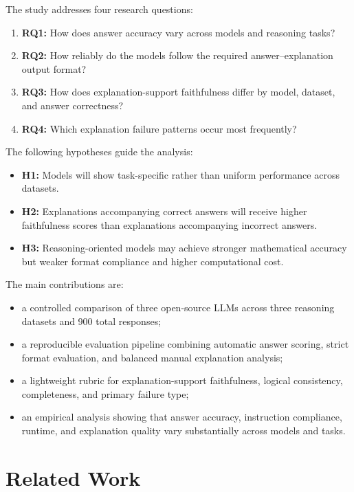 \documentclass{article}
\begin{document}
The study addresses four research questions:

\begin{enumerate}
    \item \textbf{RQ1:} How does answer accuracy vary across models and reasoning tasks?
    \item \textbf{RQ2:} How reliably do the models follow the required answer--explanation output format?
    \item \textbf{RQ3:} How does explanation-support faithfulness differ by model, dataset, and answer correctness?
    \item \textbf{RQ4:} Which explanation failure patterns occur most frequently?
\end{enumerate}

The following hypotheses guide the analysis:

\begin{itemize}
    \item \textbf{H1:} Models will show task-specific rather than uniform performance across datasets.
    \item \textbf{H2:} Explanations accompanying correct answers will receive higher faithfulness scores than explanations accompanying incorrect answers.
    \item \textbf{H3:} Reasoning-oriented models may achieve stronger mathematical accuracy but weaker format compliance and higher computational cost.
\end{itemize}

The main contributions are:

\begin{itemize}
    \item a controlled comparison of three open-source LLMs across three reasoning datasets and 900 total responses;
    \item a reproducible evaluation pipeline combining automatic answer scoring, strict format evaluation, and balanced manual explanation analysis;
    \item a lightweight rubric for explanation-support faithfulness, logical consistency, completeness, and primary failure type;
    \item an empirical analysis showing that answer accuracy, instruction compliance, runtime, and explanation quality vary substantially across models and tasks.
\end{itemize}

\section{Related Work}
\end{document}
